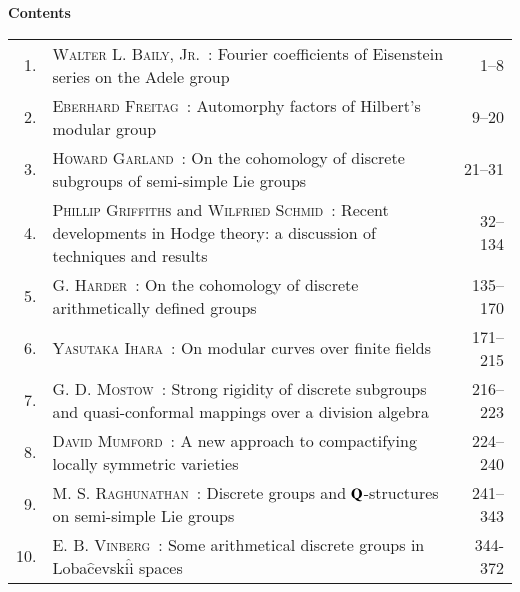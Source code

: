 
\thispagestyle{empty}

\noindent
{\bf\huge Contents}

\vskip 1cm


\noindent
\renewcommand{\arraystretch}{1.7}
\begin{longtable}[l]{r>{\raggedright}p{8cm}r}
1. & \textsc{Walter L. Baily, Jr.~:} Fourier coefficients of Eisenstein series on the Adele group & 1--8 \\
2. & \textsc{Eberhard Freitag~:} Automorphy factors of Hilbert's modular group & 9--20 \\
3. & \textsc{Howard Garland~:} On the cohomology of discrete subgroups of semi-simple Lie groups & 21--31 \\
4. & \textsc{Phillip Griffiths} and \textsc{Wilfried Schmid~:} Recent developments in Hodge theory: a discussion of techniques and results & 32--134 \\
5. & \textsc{G. Harder~:} On the cohomology of discrete arithmetically defined groups & 135--170 \\
6. & \textsc{Yasutaka Ihara~:} On modular curves over finite fields & 171--215 \\
7. & \textsc{G. D. Mostow~:} Strong rigidity of discrete subgroups and quasi-conformal mappings over a division algebra & 216--223 \\
8. & \textsc{David Mumford~:} A new approach to compactifying locally symmetric varieties & 224--240 \\
9. &  \textsc{M. S. Raghunathan~:} Discrete groups and $\mathbf{Q}$-structures on semi-simple Lie groups & 241--343 \\
10. &  \textsc{E. B. Vinberg~:} Some arithmetical discrete groups in Loba$\hat{\text{c}}$evski$\hat{\text{i}}$ spaces & 344-372 
\end{longtable}

\thispagestyle{empty}
